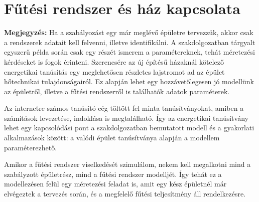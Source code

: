 

\section{Fűtési rendszer és ház kapcsolata}

\begin{formal}
	\textbf{Megjegyzés:}
	Ha a szabályozást egy már meglévő épületre tervezzük, akkor csak a rendszerek adatait kell felvenni, illetve identifikálni. A szakdolgozatban tárgyalt egyszerű példa során csak egy részét ismerem a paramétereknek, tehát méretezési kérdéseket is fogok érinteni.  Szerencsére az új építésű házaknál kötelező energetikai tanúsítás%
 egy meglehetősen részletes lajstromot ad az épület hőtechnikai tulajdonságairól. Ez alapján lehet egy hozzávetőlegesen jó modellünk az épületről, illetve a fűtési rendszerről is találhatók adatok paraméterek.

\end{formal}



 Az internetre számos tanúsító cég töltött fel minta tanúsítványokat, amiben a számítások levezetése, indoklása is megtalálható. Így az energetikai tanúsítvány lehet egy kapcsolódási pont a szakdolgozatban bemutatott modell és a gyakorlati alkalmazások között: a valódi épület tanúsítványa alapján a modellem paraméterezhető.


Amikor a fűtési rendszer viselkedését szimulálom, nekem kell megalkotni mind a szabályzott épületrész, mind a fűtési rendszer modelljét. Így tehát ez a modellezésen felül egy méretezési feladat is, amit egy kész épületnél már elvégeztek a tervezés során, és a megfelelő fűtési teljesítmény áll rendelkezésre. %






%
%
%


